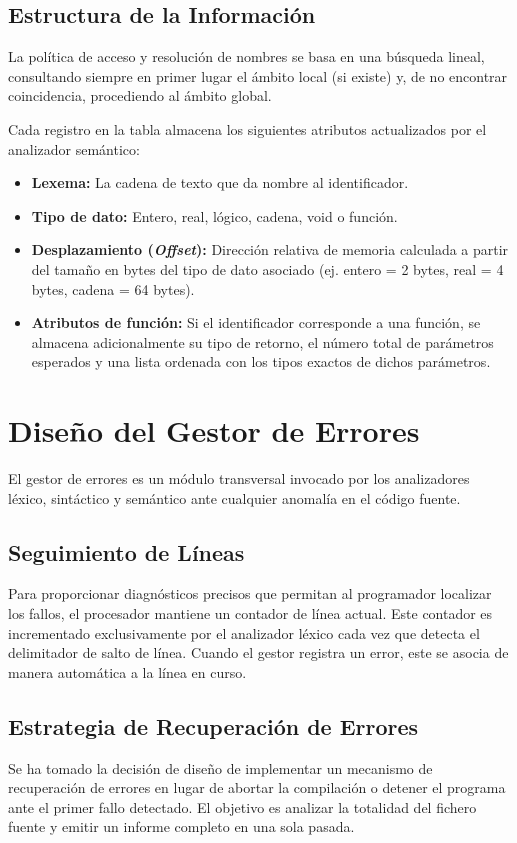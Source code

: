 \documentclass{article}
\begin{document}
\subsection{Estructura de la Información}
La política de acceso y resolución de nombres se basa en una búsqueda lineal, consultando siempre en primer lugar el ámbito local (si existe) y, de no encontrar coincidencia, procediendo al ámbito global. 

Cada registro en la tabla almacena los siguientes atributos actualizados por el analizador semántico:
\begin{itemize}
    \item \textbf{Lexema:} La cadena de texto que da nombre al identificador.
    \item \textbf{Tipo de dato:} Entero, real, lógico, cadena, void o función.
    \item \textbf{Desplazamiento (\textit{Offset}):} Dirección relativa de memoria calculada a partir del tamaño en bytes del tipo de dato asociado (ej. entero = 2 bytes, real = 4 bytes, cadena = 64 bytes).
    \item \textbf{Atributos de función:} Si el identificador corresponde a una función, se almacena adicionalmente su tipo de retorno, el número total de parámetros esperados y una lista ordenada con los tipos exactos de dichos parámetros.
\end{itemize}

\newpage

\section{Diseño del Gestor de Errores}

El gestor de errores es un módulo transversal invocado por los analizadores léxico, sintáctico y semántico ante cualquier anomalía en el código fuente.

\subsection{Seguimiento de Líneas}
Para proporcionar diagnósticos precisos que permitan al programador localizar los fallos, el procesador mantiene un contador de línea actual. Este contador es incrementado exclusivamente por el analizador léxico cada vez que detecta el delimitador de salto de línea. Cuando el gestor registra un error, este se asocia de manera automática a la línea en curso.

\subsection{Estrategia de Recuperación de Errores}
Se ha tomado la decisión de diseño de implementar un mecanismo de recuperación de errores en lugar de abortar la compilación o detener el programa ante el primer fallo detectado. El objetivo es analizar la totalidad del fichero fuente y emitir un informe completo en una sola pasada.
\end{document}
